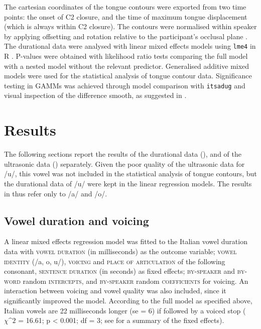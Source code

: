 \documentclass[authoryear, twocolumn]{elsarticle}
\begin{document}
The cartesian coordinates of the tongue contours were exported from two
time points: the onset of C2 closure, and the time of maximum tongue
displacement (which is always within C2 closure). The contours were
normalised within speaker by applying offsetting and rotation relative
to the participant's occlusal plane \citep{scobbie2011}. The durational
data were analysed with linear mixed effects models using \texttt{lme4}
in R \citep{r-core-team2017, bates2015}. P-values were obtained with
likelihood ratio tests comparing the full model with a nested model
without the relevant predictor. Generalised additive mixed models
\citep[GAMMs,][]{wood2006, zuur2012} were used for the statistical
analysis of tongue contour data. Significance testing in GAMMs was
achieved through model comparison with \texttt{itsadug}
\citep{van-rij2017} and visual inspection of the difference smooth, as
suggested in \citet{soskuthy2017}.

\section{Results}\label{results}

The following sections report the results of the durational data
(), and of the ultrasonic data ()
separately. Given the poor quality of the ultrasonic data for /u/, this
vowel was not included in the statistical analysis of tongue contours,
but the durational data of /u/ were kept in the linear regression
models. The results in  thus refer only to /a/ and /o/.

\subsection{Vowel duration and
voicing}\label{vowel-duration-and-voicing}

\label{s:vow-duration}

A linear mixed effects regression model was fitted to the Italian vowel
duration data with \textsc{vowel duration} (in milliseconds) as the
outcome variable; \textsc{vowel identity} (/a, o, u/), \textsc{voicing}
and \textsc{place of articulation} of the following consonant,
\textsc{sentence duration} (in seconds) as fixed effects;
\textsc{by-speaker} and \textsc{by-word} random \textsc{intercepts}, and
\textsc{by-speaker} random \textsc{coefficients} for voicing. An
interaction between voicing and vowel quality was also included, since
it significantly improved the model. According to the full model as
specified above, Italian vowels are 22 milliseconds longer (se = 6) if
followed by a voiced stop (\(\chi\^2\) = 16.61; p \textless{} 0.001; df
= 3; see  for a summary of the fixed effects).
\end{document}
